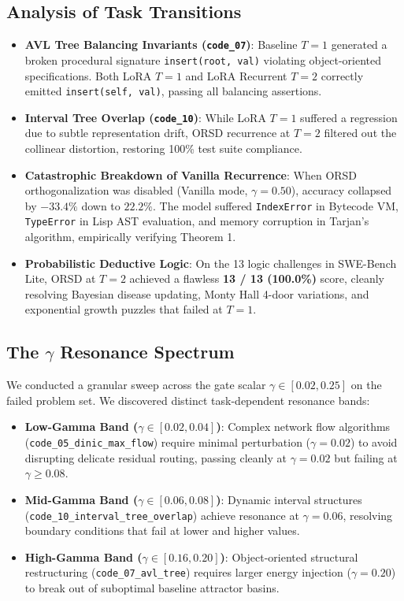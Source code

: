 \documentclass[11pt,a4paper]{article}
\theoremstyle{plain}
\theoremstyle{definition}
\theoremstyle{remark}
\begin{document}
\subsection{Analysis of Task Transitions}
\begin{itemize}
    \item \textbf{AVL Tree Balancing Invariants (\texttt{code\_07})}: Baseline $T=1$ generated a broken procedural signature \texttt{insert(root, val)} violating object-oriented specifications. Both LoRA $T=1$ and LoRA Recurrent $T=2$ correctly emitted \texttt{insert(self, val)}, passing all balancing assertions.
    \item \textbf{Interval Tree Overlap (\texttt{code\_10})}: While LoRA $T=1$ suffered a regression due to subtle representation drift, ORSD recurrence at $T=2$ filtered out the collinear distortion, restoring 100\% test suite compliance.
    \item \textbf{Catastrophic Breakdown of Vanilla Recurrence}: When ORSD orthogonalization was disabled (Vanilla mode, $\gamma=0.50$), accuracy collapsed by $-33.4\%$ down to $22.2\%$. The model suffered \texttt{IndexError} in Bytecode VM, \texttt{TypeError} in Lisp AST evaluation, and memory corruption in Tarjan's algorithm, empirically verifying Theorem 1.
    \item \textbf{Probabilistic Deductive Logic}: On the 13 logic challenges in SWE-Bench Lite, ORSD at $T=2$ achieved a flawless \textbf{13 / 13 (100.0\%)} score, cleanly resolving Bayesian disease updating, Monty Hall 4-door variations, and exponential growth puzzles that failed at $T=1$.
\end{itemize}

\subsection{The $\gamma$ Resonance Spectrum}
We conducted a granular sweep across the gate scalar $\gamma \in [0.02, 0.25]$ on the failed problem set. We discovered distinct task-dependent resonance bands:
\begin{itemize}
    \item \textbf{Low-Gamma Band ($\gamma \in [0.02, 0.04]$)}: Complex network flow algorithms (\texttt{code\_05\_dinic\_max\_flow}) require minimal perturbation ($\gamma=0.02$) to avoid disrupting delicate residual routing, passing cleanly at $\gamma=0.02$ but failing at $\gamma \ge 0.08$.
    \item \textbf{Mid-Gamma Band ($\gamma \in [0.06, 0.08]$)}: Dynamic interval structures (\texttt{code\_10\_interval\_tree\_overlap}) achieve resonance at $\gamma=0.06$, resolving boundary conditions that fail at lower and higher values.
    \item \textbf{High-Gamma Band ($\gamma \in [0.16, 0.20]$)}: Object-oriented structural restructuring (\texttt{code\_07\_avl\_tree}) requires larger energy injection ($\gamma=0.20$) to break out of suboptimal baseline attractor basins.
\end{itemize}
\end{document}
